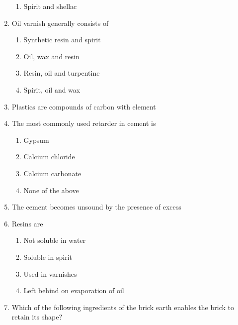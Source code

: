 \documentclass[11pt,a4paper]{article}
\begin{document}
\begin{enumerate}
\begin{enumerate}[label=\Alph*.]
\item{Spirit and shellac}
\end{enumerate}
\item{Oil varnish generally consists of}
\begin{enumerate}[label=\Alph*.]
\item{Synthetic resin and spirit}
\item{Oil, wax and resin}
\item{Resin, oil and turpentine}
\item{Spirit, oil and wax}
\end{enumerate}
\item{Plastics are compounds of carbon with element}
\\
\item{The most commonly used retarder in cement is}
\begin{enumerate}[label=\Alph*.]
\item{Gypsum}
\item{Calcium chloride}
\item{Calcium carbonate}
\item{None of the above}
\end{enumerate}
\item{The cement becomes unsound by the presence of excess}
\\
\item{Resins are}
\begin{enumerate}[label=\Alph*.]
\item{Not soluble in water}
\item{Soluble in spirit}
\item{Used in varnishes}
\item{Left behind on evaporation of oil}
\end{enumerate}
\item{Which of the following ingredients of the brick earth enables the brick to retain its shape?}

\end{enumerate}
\end{document}
